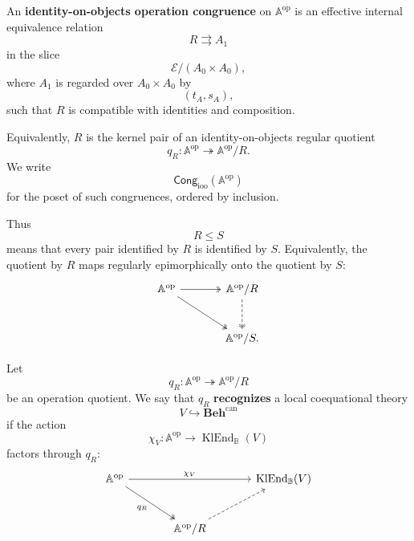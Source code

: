 \begin{definition}
\label{def:to-identity-on-objects-operation-congruence}
    An \textbf{identity-on-objects operation congruence} on
    \(\mathbb A^{\mathrm{op}}\) is an effective internal equivalence relation
    \[
        R\rightrightarrows A_1
    \]
    in the slice
    \[
        \mathcal E/(A_0\times A_0),
    \]
    where \(A_1\) is regarded over \(A_0\times A_0\) by
    \[
        (t_A,s_A),
    \]
    such that \(R\) is compatible with identities and composition.

    Equivalently, \(R\) is the kernel pair of an identity-on-objects regular
    quotient
    \[
        q_R:
        \mathbb A^{\mathrm{op}}
        \twoheadrightarrow
        \mathbb A^{\mathrm{op}}/R.
    \]
    We write
    \[
        \mathsf{Cong}_{\mathrm{ioo}}(\mathbb A^{\mathrm{op}})
    \]
    for the poset of such congruences, ordered by inclusion.
\end{definition}

Thus
\[
    R\leq S
\]
means that every pair identified by \(R\) is identified by \(S\). Equivalently,
the quotient by \(R\) maps regularly epimorphically onto the quotient by \(S\):
\[
\begin{tikzcd}[column sep=large, row sep=large]
    \mathbb A^{\mathrm{op}}
        \arrow[r, two heads]
        \arrow[dr, two heads]
    &
    \mathbb A^{\mathrm{op}}/R
        \arrow[d, two heads, dashed]
    \\
    &
    \mathbb A^{\mathrm{op}}/S .
\end{tikzcd}
\]

\begin{definition}
\label{def:to-recognition-by-operation-quotient}
    Let
    \[
        q_R:
        \mathbb A^{\mathrm{op}}
        \twoheadrightarrow
        \mathbb A^{\mathrm{op}}/R
    \]
    be an operation quotient. We say that \(q_R\) \textbf{recognizes} a local
    coequational theory
    \[
        V\hookrightarrow\mathbf{Beh}^{\mathrm{can}}
    \]
    if the action
    \[
        \chi_V:
        \mathbb A^{\mathrm{op}}\to
        \operatorname{KlEnd}_{\mathbb B}(V)
    \]
    factors through \(q_R\):
    \[
    \begin{tikzcd}[column sep=large, row sep=large]
        \mathbb A^{\mathrm{op}}
            \arrow[rr, "\chi_V"]
            \arrow[dr, two heads, "q_R"']
        &&
        \operatorname{KlEnd}_{\mathbb B}(V)
        \\
        &
        \mathbb A^{\mathrm{op}}/R
            \arrow[ur, dashed]
        &
    \end{tikzcd}
    \]
\end{definition}

